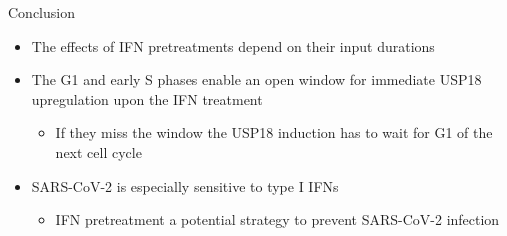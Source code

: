 \documentclass[bigger]{beamer}
\begin{document}
\begin{frame}[label={sec:org7b2ea05}]{Conclusion}
\begin{itemize}
\item The effects of IFN pretreatments depend on their input durations
\item The G1 and early S phases enable an open window for immediate USP18
upregulation upon the IFN treatment
\begin{itemize}
\item If they miss the window the USP18 induction has to wait for G1 of the next cell cycle
\end{itemize}
\item SARS-CoV-2 is especially sensitive to type I IFNs
\begin{itemize}
\item IFN pretreatment a potential strategy to prevent SARS-CoV-2 infection
\end{itemize}
\end{itemize}
\end{frame}
\end{document}
